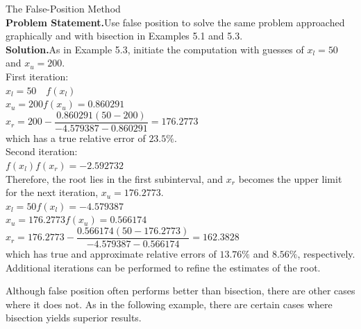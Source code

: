 \documentclass[../main.tex]{subfiles}
\begin{document}
\begin{example} The False-Position Method\\

    \noindent\textbf{Problem Statement.}\quad Use false position to solve the same problem approached graphically
    and with bisection in Examples 5.1 and 5.3.\\

    \noindent\textbf{Solution.}\quad As in Example 5.3, initiate the computation with guesses of $x_l = 50$ and
    $x_u = 200$.\\

    \noindent First iteration:\\

    $x_l = 50\text{ }$ \indent$f(x_l)$\\

    $x_u=200$\indent$f(x_u)=0.860291$\\

    $x_r=200-\dfrac{0.860291(50 - 200)}{-4.579387 - 0.860291}=176.2773$\\

    \noindent which has a true relative error of $23.5\%$.\\

    \noindent Second iteration:\\

    $f(x_l)f(x_r)=-2.592732$\\

    \noindent Therefore, the root lies in the first subinterval, and $x_r$ becomes the upper limit for the next
    iteration, $x_u = 176.2773$.\\

    $x_l=50$\hspace{22.5mm}$f(x_l) = -4.579387$\\

    $x_u=176.2773$\indent$f(x_u)=0.566174$\\

    $x_r=176.2773-\dfrac{0.566174(50 - 176.2773)}{-4.579387 - 0.566174}=162.3828$\\

    \noindent which has true and approximate relative errors of $13.76\%$ and $8.56\%$, respectively. Additional
    iterations can be performed to refine the estimates of the root.
\end{example}

Although false position often performs better than bisection, there are other cases
where it does not. As in the following example, there are certain cases where bisection
yields superior results.\\
\newpage
\end{document}
